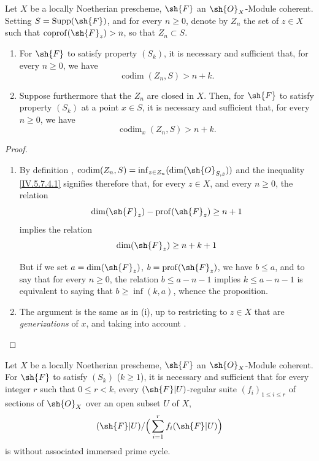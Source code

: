 \begin{proposition}[5.7.4]
\label{IV.5.7.4}
Let $X$ be a locally Noetherian prescheme, $\sh{F}$ an $\sh{O}_X$-Module coherent.
Setting $S=\operatorname{Supp}(\sh{F})$, and for every $n\geq 0$, denote by $Z_n$ the set of $z\in X$ such that $\operatorname{coprof}(\sh{F}_z)>n$, so that $Z_n\subset S$.
\begin{enumerate}[label=(\roman*)]
  \item For $\sh{F}$ to satisfy property $(S_k)$, it is necessary and sufficient that, for every $n\geq 0$, we have
\[
\tag{5.7.4.1}\label{IV.5.7.4.1}
  \operatorname{codim}(Z_n, S) > n+k.
\]
  \item Suppose furthermore that the $Z_n$ are closed in $X$.
Then, for $\sh{F}$ to satisfy property $(S_k)$ at a point $x\in S$, it is necessary and sufficient that, for every $n\geq 0$, we have
\[
\tag{5.7.4.2}\label{IV.5.7.4.2}
  \operatorname{codim}_x(Z_n, S) > n+k.
\]
\end{enumerate}
\end{proposition}

\begin{proof}
\begin{enumerate}[label=(\roman*)]
  \item By definition , $\operatorname{codim}(Z_n,S)=\inf_{z\in Z_n}(\dim(\sh{O}_{S,z}))$ and the inequality \eqref{IV.5.7.4.1} signifies therefore  that, for every $z\in X$, and every $n\geq 0$, the relation
\[
  \dim(\sh{F}_z) - \operatorname{prof}(\sh{F}_z) \geq n+1
\]
implies the relation
\[
  \dim(\sh{F}_z) \geq n+k+1
\]

But if we set $a=\dim(\sh{F}_z)$, $b=\operatorname{prof}(\sh{F}_z)$, we have $b\leq a$, and to say that for every $n\geq 0$, the relation $b\leq a-n-1$ implies $k\leq a-n-1$ is equivalent to saying that $b\geq\inf(k,a)$, whence the proposition.
  \item The argument is the same as in (i), up to restricting to $z\in X$ that are \emph{generizations} of $x$, and taking into account .
\end{enumerate}
\end{proof}

\begin{proposition}[5.7.5]
\label{IV.5.7.5}
Let $X$ be a locally Noetherian prescheme, $\sh{F}$ an $\sh{O}_X$-Module coherent.
For $\sh{F}$ to satisfy $(S_k)$ ($k\geq 1$), it is necessary and sufficient that for every integer $r$ such that $0\leq r<k$, every $(\sh{F}|U)$-regular suite $(f_i)_{1\leq i\leq r}$ of sections of $\sh{O}_X$ over an open subset $U$ of $X$,
\[
  (\sh{F}|U)/\Big(\sum_{i=1}^r f_i(\sh{F}|U)\Big)
\]
is without associated immersed prime cycle.
\end{proposition}

